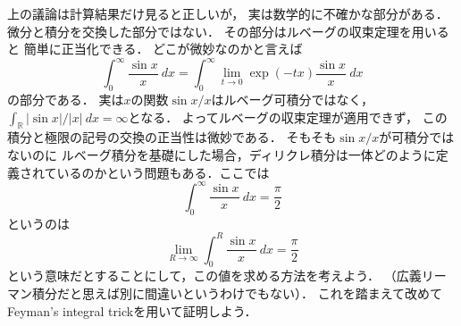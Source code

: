 \documentclass[leqno, 12pt]{jsarticle}
\newcommand{\rr}{\mathbb{R}}
\begin{document}
上の議論は計算結果だけ見ると正しいが，
実は数学的に不確かな部分がある．
微分と積分を交換した部分ではない．
その部分はルベーグの収束定理を用いると
簡単に正当化できる．
どこが微妙なのかと言えば
\[
\int_0^{\infty}\frac{\sin x}{x}\ dx
	=
	\int_{0}^{\infty}\lim_{t\to 0}\exp(-tx)\frac{\sin x}{x}\ dx
\]
の部分である．
実は$x$の関数$\sin x/x$はルベーグ可積分ではなく，
$\int_{\rr}|\sin x|/|x|\ dx=\infty$となる．
よってルベーグの収束定理が適用できず，
この積分と極限の記号の交換の正当性は微妙である．
そもそも$\sin x/x$が可積分ではないのに
ルベーグ積分を基礎にした場合，ディリクレ積分は一体どのように定義されているのかという問題もある．ここでは
\[
\int_0^{\infty}\frac{\sin x}{x}\ dx=\frac{\pi}{2}
\]
というのは
\[
\lim_{R\to \infty}\int_0^{R}\frac{\sin x}{x}\ dx=\frac{\pi}{2}
\]
という意味だとすることにして，この値を求める方法を考えよう．
（広義リーマン積分だと思えば別に間違いというわけでもない）．
これを踏まえて改めてFeyman's integral trickを用いて証明しよう．
\end{document}
